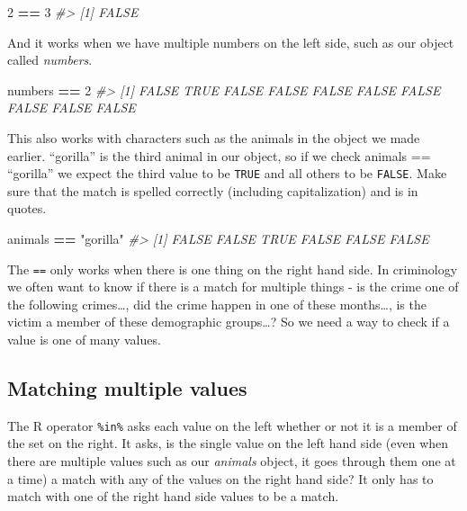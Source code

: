 \documentclass[
  12pt,
]{book}
\newenvironment{Shaded}{\begin{snugshade}}{\end{snugshade}}
\newcommand{\CommentTok}[1]{\textcolor[rgb]{0.56,0.35,0.01}{\textit{#1}}}
\newcommand{\DecValTok}[1]{\textcolor[rgb]{0.00,0.00,0.81}{#1}}
\newcommand{\NormalTok}[1]{#1}
\newcommand{\OperatorTok}[1]{\textcolor[rgb]{0.81,0.36,0.00}{\textbf{#1}}}
\newcommand{\StringTok}[1]{\textcolor[rgb]{0.31,0.60,0.02}{#1}}
\begin{document}
\begin{Shaded}
\begin{Highlighting}[]
\DecValTok{2} \OperatorTok{==}\StringTok{ }\DecValTok{3}
\CommentTok{\#> [1] FALSE}
\end{Highlighting}
\end{Shaded}

And it works when we have multiple numbers on the left side, such as our object called \emph{numbers}.

\begin{Shaded}
\begin{Highlighting}[]
\NormalTok{numbers }\OperatorTok{==}\StringTok{ }\DecValTok{2}
\CommentTok{\#>  [1] FALSE  TRUE FALSE FALSE FALSE FALSE FALSE FALSE FALSE FALSE}
\end{Highlighting}
\end{Shaded}

This also works with characters such as the animals in the object we made earlier. ``gorilla'' is the third animal in our object, so if we check animals == ``gorilla'' we expect the third value to be \texttt{TRUE} and all others to be \texttt{FALSE}. Make sure that the match is spelled correctly (including capitalization) and is in quotes.

\begin{Shaded}
\begin{Highlighting}[]
\NormalTok{animals }\OperatorTok{==}\StringTok{ "gorilla"}
\CommentTok{\#> [1] FALSE FALSE  TRUE FALSE FALSE FALSE}
\end{Highlighting}
\end{Shaded}

The \texttt{==} only works when there is one thing on the right hand side. In criminology we often want to know if there is a match for multiple things - is the crime one of the following crimes\ldots, did the crime happen in one of these months\ldots, is the victim a member of these demographic groups\ldots? So we need a way to check if a value is one of many values.

\hypertarget{matching-multiple-values}{%
\subsection{Matching multiple values}\label{matching-multiple-values}}

The R operator \texttt{\%in\%} asks each value on the left whether or not it is a member of the set on the right. It asks, is the single value on the left hand side (even when there are multiple values such as our \emph{animals} object, it goes through them one at a time) a match with any of the values on the right hand side? It only has to match with one of the right hand side values to be a match.
\end{document}
